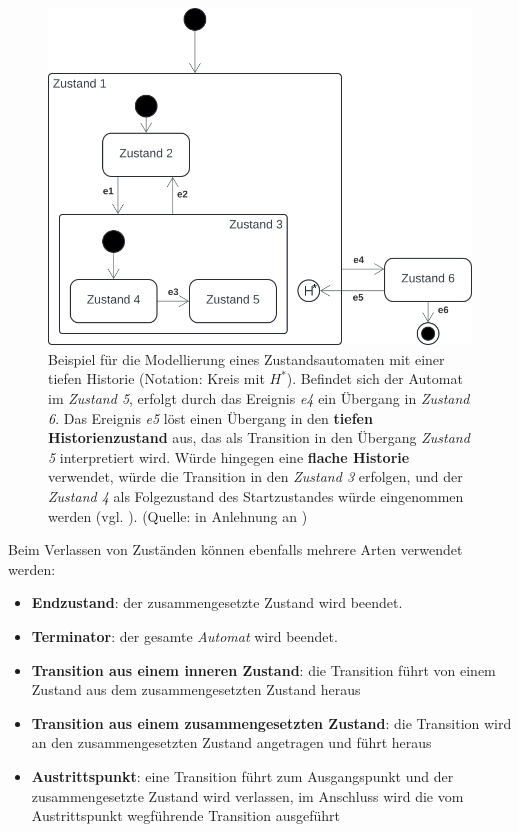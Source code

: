 \begin{figure}
    \centering
    \includegraphics[scale=0.4]{part three/Zustandsautomaten/img/tiefehistorie}
    \caption{Beispiel für die Modellierung eines Zustandsautomaten mit einer tiefen Historie (Notation: Kreis mit $H^*$). Befindet sich der Automat im \textit{Zustand 5}, erfolgt durch das Ereignis \textit{e4} ein Übergang in \textit{Zustand 6}. Das Ereignis \textit{e5} löst einen Übergang in den \textbf{tiefen Historienzustand} aus, das als Transition in den Übergang \textit{Zustand 5} interpretiert wird. Würde hingegen eine \textbf{flache Historie} verwendet, würde die Transition in den \textit{Zustand 3} erfolgen, und der \textit{Zustand 4} als Folgezustand des Startzustandes würde eingenommen werden (vgl. \cite[342 f.]{Bal05}). (Quelle: in Anlehnung an \cite[342, Abb. 6.11-7]{Bal05})}
    \label{fig:tiefehistorie}
\end{figure}


\noindent
Beim Verlassen von Zuständen können ebenfalls mehrere Arten verwendet werden:

\begin{itemize}
    \item \textbf{Endzustand}: der zusammengesetzte Zustand wird beendet.
    \item \textbf{Terminator}: der gesamte \textit{Automat} wird beendet.
    \item \textbf{Transition aus einem inneren Zustand}: die Transition führt von einem Zustand aus dem zusammengesetzten Zustand heraus
    \item \textbf{Transition aus einem zusammengesetzten Zustand}: die Transition wird an den zusammengesetzten Zustand angetragen und führt heraus
    \item \textbf{Austrittspunkt}: eine Transition führt zum Ausgangspunkt und der zusammengesetzte Zustand wird verlassen, im Anschluss wird die vom Austrittspunkt wegführende Transition ausgeführt
\end{itemize}


